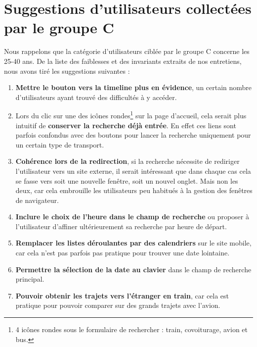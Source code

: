 
\section{Suggestions d'utilisateurs collect\'{e}es par le groupe C}

Nous rappelons que la cat\'{e}gorie d'utilisateurs cibl\'{e}e par le groupe C concerne les 25-40 ans. De la liste des faiblesses et des invariants extraits de nos entretiens, nous avons tir\'{e} les suggestions suivantes :

\begin{enumerate}

\item \textbf{Mettre le bouton vers la timeline plus en \'{e}vidence}, un certain nombre d'utilisateurs ayant trouv\'{e} des difficult\'{e}s \`{a} y acc\'{e}der.
\item Lors du clic sur une des ic\^{o}nes rondes\footnote{4 ic\^{o}nes rondes sous le formulaire de rechercher : train, covoiturage, avion et bus.} sur la page d'accueil, cela serait plus intuitif de \textbf{conserver la recherche d\'{e}j\`{a} entr\'{e}e}. En effet ces liens sont parfois confondus avec des boutons pour lancer la recherche uniquement pour un certain type de transport.
\item \textbf{Coh\'{e}rence lors de la redirection}, si la recherche n\'{e}cessite de rediriger l'utilisateur vers un site externe, il serait int\'{e}ressant que dans chaque cas cela se fasse vers soit une nouvelle fen\^{e}tre, soit un nouvel onglet. Mais non les deux, car cela embrouille les utilisateurs peu habitu\'{e}s \`{a} la gestion des fen\^{e}tres de navigateur.
\item \textbf{Inclure le choix de l'heure dans le champ de recherche} ou proposer \`{a} l'utilisateur d'affiner ult\'{e}rieurement sa recherche par heure de d\'{e}part.
\item \textbf{Remplacer les listes d\'{e}roulantes par des calendriers} sur le site mobile, car cela n'est pas parfois pas pratique pour trouver une date lointaine.
\item \textbf{Permettre la s\'{e}lection de la date au clavier} dans le champ de recherche principal.
\item \textbf{Pouvoir obtenir les trajets vers l'\'{e}tranger en train}, car cela est pratique pour pouvoir comparer sur des grands trajets avec l'avion.

\end{enumerate}